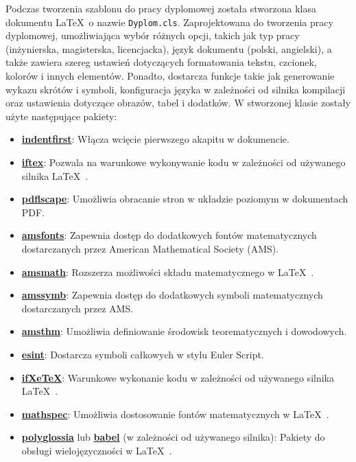 Podczas tworzenia szablonu do pracy dyplomowej została stworzona klasa dokumentu \LaTeX\ o nazwie \texttt{Dyplom.cls}. Zaprojektowana do tworzenia pracy dyplomowej, umożliwiająca wybór różnych opcji, takich jak typ pracy (inżynierska, magisterska, licencjacka),  język dokumentu (polski, angielski), a także zawiera szereg ustawień dotyczących formatowania tekstu, czcionek, kolorów i innych elementów. Ponadto, dostarcza funkcje takie jak generowanie wykazu skrótów i symboli, konfiguracja języka w zależności od silnika kompilacji oraz ustawienia dotyczące obrazów, tabel i dodatków. W stworzonej klasie zostały użyte następujące pakiety:
\begin{itemize} 
\item \href{https://www.ctan.org/pkg/indentfirst}{\textbf{indentfirst}}: Włącza wcięcie pierwszego akapitu w dokumencie.
\item \href{https://www.ctan.org/pkg/iftex}{\textbf{iftex}}: Pozwala na warunkowe wykonywanie kodu w zależności od używanego silnika \LaTeX\ .
\item \href{https://www.ctan.org/pkg/pdflscape}{\textbf{pdflscape}}: Umożliwia obracanie stron w układzie poziomym w dokumentach PDF.
\item \href{https://www.ctan.org/pkg/amsfonts}{\textbf{amsfonts}}: Zapewnia dostęp do dodatkowych fontów matematycznych dostarczanych przez American Mathematical Society (AMS).
\item \href{https://www.ctan.org/pkg/amsmath}{\textbf{amsmath}}: Rozszerza możliwości składu matematycznego w \LaTeX\ .
\item \href{https://www.ctan.org/pkg/amssymb}{\textbf{amssymb}}: Zapewnia dostęp do dodatkowych symboli matematycznych dostarczanych przez AMS.
\item \href{https://www.ctan.org/pkg/amsthm}{\textbf{amsthm}}: Umożliwia definiowanie środowisk teorematycznych i dowodowych.
\item \href{https://www.ctan.org/pkg/esint}{\textbf{esint}}: Dostarcza symboli całkowych w stylu Euler Script.
\item \href{https://www.ctan.org/pkg/ifxetex}{\textbf{ifXeTeX}}: Warunkowe wykonanie kodu w zależności od używanego silnika \LaTeX\ .
\item \href{https://www.ctan.org/pkg/mathspec}{\textbf{mathspec}}: Umożliwia dostosowanie fontów matematycznych w \LaTeX\ .
\item \href{https://www.ctan.org/pkg/polyglossia}{\textbf{polyglossia}} lub \href{https://www.ctan.org/pkg/babel}{\textbf{babel}} (w zależności od używanego silnika): Pakiety do obsługi wielojęzyczności w \LaTeX\ .

\end{itemize}
